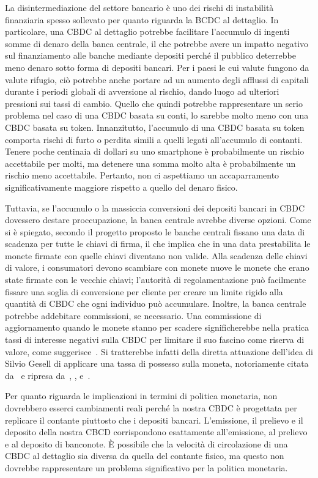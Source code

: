 \documentclass{article}
\begin{document}
La disintermediazione del settore bancario è uno dei rischi di 
instabilità finanziaria spesso sollevato per quanto riguarda la BCDC 
al dettaglio. In particolare, una CBDC al dettaglio potrebbe 
facilitare l'accumulo di ingenti somme di denaro della banca 
centrale, il che potrebbe avere un impatto negativo sul finanziamento 
alle banche mediante depositi perché il pubblico deterrebbe meno 
denaro sotto forma di depositi bancari. Per i paesi le cui valute 
fungono da valute rifugio, ciò potrebbe anche portare ad un aumento 
degli afflussi di capitali durante i periodi globali di avversione al 
rischio, dando luogo ad ulteriori pressioni sui tassi di cambio. 
Quello che quindi potrebbe rappresentare un serio problema nel caso di 
una CBDC basata su conti, lo sarebbe molto meno con una CBDC basata 
su token. Innanzitutto, l'accumulo di una CBDC basata su token comporta 
rischi di furto o perdita simili a quelli legati all'accumulo di 
contanti. Tenere poche centinaia di dollari su uno smartphone è 
probabilmente un rischio accettabile per molti, ma detenere una somma 
molto alta è probabilmente un rischio meno accettabile. Pertanto, non 
ci aspettiamo un accaparramento significativamente maggiore rispetto a 
quello del denaro fisico.

Tuttavia, se l'accumulo o la massiccia conversioni dei depositi 
bancari in CBDC dovessero destare proccupazione, la banca centrale 
avrebbe diverse opzioni. Come si è spiegato, secondo il progetto 
proposto le banche centrali fissano una data di scadenza per tutte le 
chiavi di firma, il che implica che in una data prestabilita le monete 
firmate con quelle chiavi diventano non valide. Alla scadenza delle 
chiavi di valore, i consumatori devono scambiare con monete nuove le 
monete che erano state firmate con le vecchie chiavi; l'autorità di 
regolamentazione può facilmente fissare una soglia di conversione per 
cliente per creare un limite rigido alla quantità di CBDC che ogni 
individuo può accumulare. Inoltre, la banca centrale potrebbe addebitare 
commissioni, se necessario. Una commissione di aggiornamento quando le monete 
stanno per scadere significherebbe nella pratica tassi di interesse negativi 
sulla CBDC per limitare il suo fascino come riserva di valore, come 
suggerisce~\cite{Bindseil}. Si tratterebbe infatti della diretta attuazione 
dell'idea di Silvio Gesell di applicare una tassa di possesso sulla moneta, 
notoriamente citata da~\cite{Keynes} e ripresa da~\cite{Goodfriend}, 
\cite{Buiter}, e~\cite{Agarwal}.

Per quanto riguarda le implicazioni in termini di politica monetaria, 
non dovrebbero esserci cambiamenti reali perché la nostra CBDC è 
progettata per replicare il contante piuttosto che i depositi bancari. 
L'emissione, il prelievo e il deposito della nostra CBCD corrispondono 
esattamente all'emissione, al prelievo e al deposito di banconote. È 
possibile che la velocità di circolazione di una CBDC al dettaglio sia 
diversa da quella del contante fisico, ma questo non dovrebbe 
rappresentare un problema significativo per la politica monetaria.
\end{document}
